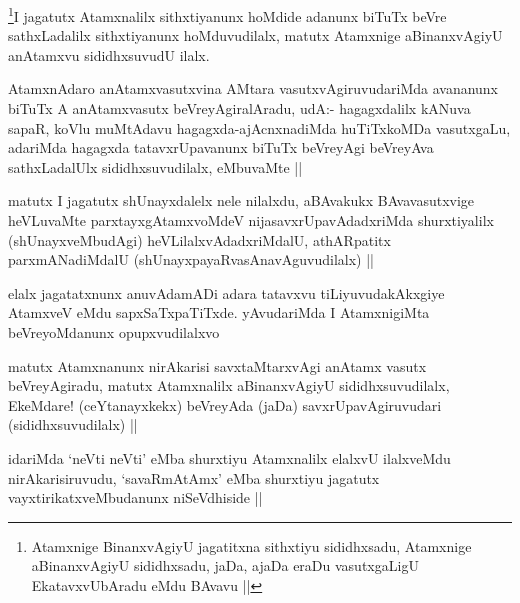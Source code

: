 \begin{artha}
\footnote{Atamxnige BinanxvAgiyU jagatitxna sithxtiyu sididhxsadu,
  Atamxnige aBinanxvAgiyU sididhxsadu, jaDa, ajaDa eraDu vasutxgaLigU
  EkatavxvUbAradu eMdu BAvavu ||}I jagatutx Atamxnalilx sithxtiyanunx hoMdide adanunx biTuTx beVre
sathxLadalilx sithxtiyanunx hoMduvudilalx, matutx Atamxnige
aBinanxvAgiyU anAtamxvu sididhxsuvudU ilalx.
\end{artha}


\begin{artha}
AtamxnAdaro anAtamxvasutxvina AMtara vasutxvAgiruvudariMda avananunx
biTuTx A anAtamxvasutx beVreyAgiralAradu,  udA:- hagagxdalilx kANuva
sapaR, koVlu muMtAdavu hagagxda-ajAcnxnadiMda huTiTxkoMDa vasutxgaLu,
adariMda hagagxda tatavxrUpavanunx biTuTx beVreyAgi beVreyAva
sathxLadalUlx sididhxsuvudilalx, eMbuvaMte ||
\end{artha}


\begin{artha}
matutx I jagatutx shUnayxdalelx nele nilalxdu, aBAvakukx
BAvavasutxvige heVLuvaMte parxtayxgAtamxvoMdeV nijasavxrUpavAdadxriMda
shurxtiyalilx (shUnayxveMbudAgi) heVLilalxvAdadxriMdalU, athARpatitx
parxmANadiMdalU (shUnayxpayaRvasAnavAguvudilalx) ||
\end{artha}

\begin{artha}
elalx jagatatxnunx anuvAdamADi adara tatavxvu tiLiyuvudakAkxgiye
AtamxveV eMdu sapxSaTxpaTiTxde. yAvudariMda I AtamxnigiMta
beVreyoMdanunx opupxvudilalxvo
\end{artha}

\begin{artha}
matutx Atamxnanunx nirAkarisi savxtaMtarxvAgi anAtamx vasutx
beVreyAgiradu, matutx Atamxnalilx aBinanxvAgiyU sididhxsuvudilalx,
EkeMdare! (ceYtanayxkekx) beVreyAda (jaDa) savxrUpavAgiruvudari
(sididhxsuvudilalx) ||
\end{artha}

\begin{artha}
idariMda `neVti neVti' eMba shurxtiyu Atamxnalilx elalxvU ilalxveMdu
nirAkarisiruvudu, `savaRmAtAmx' eMba shurxtiyu jagatutx
vayxtirikatxveMbudanunx niSeVdhiside ||
\end{artha}

